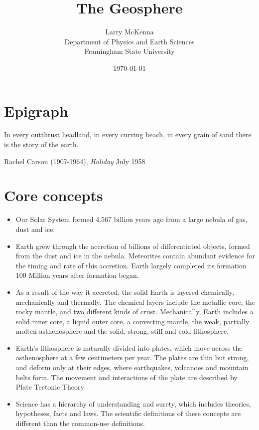 \documentclass[amstex,12pt]{book}
\begin{document}
\title{The Geosphere} \label{The Geosphere}
\date{\today}
\author{Larry McKenna\\Department of Physics and Earth Sciences\\Framingham State University}
\maketitle
\section*{Epigraph} \label{Epigraph}
\epigraph{In every outthrust headland, in every curving beach, in every grain of sand there is the story of the earth.}{Rachel Carson (1907-1964), \textit{Holiday} July 1958}

\section{Core concepts} \label{Core Concepts}
\begin{itemize}
\item Our Solar System formed 4.567 billion years ago from a large nebula of gas, dust and ice. 
\item Earth grew through the accretion of billions of differentiated objects, formed from the dust and ice in the nebula. Meteorites contain abundant evidence for the timing and rate of this accretion. Earth largely completed its formation 100 Million years after formation began. 
\item As a result of the way it accreted, the solid Earth is layered chemically, mechanically and thermally. The chemical layers include the metallic core, the rocky mantle, and two different kinds of crust. Mechanically, Earth includes a solid inner core, a liquid outer core, a convecting mantle, the weak, partially molten asthenosphere and the solid, strong, stiff and cold lithosphere.
\item Earth's lithosphere is naturally divided into plates, which move across the asthenosphere at a few centimeters per year. The plates are thin but strong, and deform only at their edges, where earthquakes, volcanoes and mountain belts form. The movement and interactions of the plate are described by Plate Tectonic Theory
\item Science has a hierarchy of understanding and surety, which includes theories, hypotheses, facts and laws. The scientific definitions of these concepts are different than the common-use definitions. 
\end{itemize}
\end{document}

